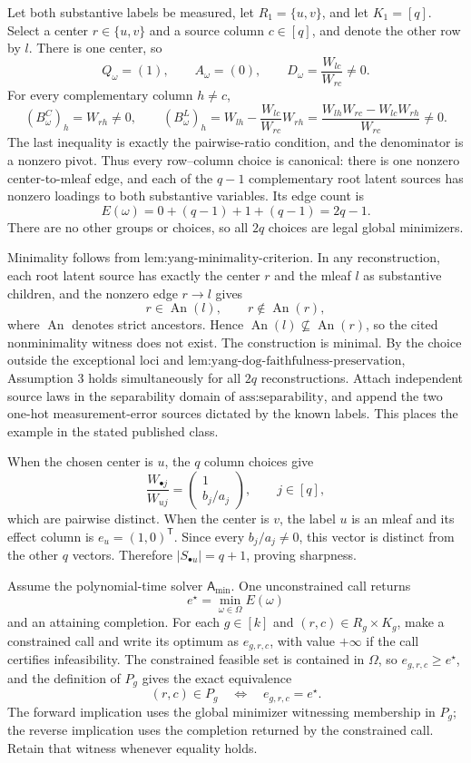 Let both substantive labels be measured, let \(R_1=\{u,v\}\), and let \(K_1=[q]\).  Select a center \(r\in\{u,v\}\) and a source column \(c\in[q]\), and denote the other row by \(l\).  There is one center, so
\[
Q_\omega=(1),
\qquad
A_\omega=(0),
\qquad
D_\omega=\frac{W_{lc}}{W_{rc}}\ne0.
\]
For every complementary column \(h\ne c\),
\[
(B^C_\omega)_h=W_{rh}\ne0,
\qquad
(B^L_\omega)_h
=W_{lh}-\frac{W_{lc}}{W_{rc}}W_{rh}
=\frac{W_{lh}W_{rc}-W_{lc}W_{rh}}{W_{rc}}\ne0.
\]
The last inequality is exactly the pairwise-ratio condition, and the denominator is a nonzero pivot.  Thus every row--column choice is canonical: there is one nonzero center-to-mleaf edge, and each of the \(q-1\) complementary root latent sources has nonzero loadings to both substantive variables.  Its edge count is
\[
E(\omega)=0+(q-1)+1+(q-1)=2q-1.
\]
There are no other groups or choices, so all \(2q\) choices are legal global minimizers.

Minimality follows from \(\text{lem:yang-minimality-criterion}\).  In any reconstruction, each root latent source has exactly the center \(r\) and the mleaf \(l\) as substantive children, and the nonzero edge \(r\to l\) gives
\[
r\in\operatorname{An}(l),
\qquad
r\notin\operatorname{An}(r),
\]
where \(\operatorname{An}\) denotes strict ancestors.  Hence \(\operatorname{An}(l)\nsubseteq\operatorname{An}(r)\), so the cited nonminimality witness does not exist.  The construction is minimal.  By the choice outside the exceptional loci and \(\text{lem:yang-dog-faithfulness-preservation}\), Assumption 3 holds simultaneously for all \(2q\) reconstructions.  Attach independent source laws in the separability domain of \(\text{ass:separability}\), and append the two one-hot measurement-error sources dictated by the known labels.  This places the example in the stated published class.

When the chosen center is \(u\), the \(q\) column choices give
\[
\frac{W_{\bullet j}}{W_{uj}}
=\begin{pmatrix}1\\b_j/a_j\end{pmatrix},
\qquad j\in[q],
\]
which are pairwise distinct.  When the center is \(v\), the label \(u\) is an mleaf and its effect column is \(e_u=(1,0)^\mathsf T\).  Since every \(b_j/a_j\ne0\), this vector is distinct from the other \(q\) vectors.  Therefore \(|S_{\bullet u}|=q+1\), proving sharpness.

Assume the polynomial-time solver \(\mathsf A_{\min}\).  One unconstrained call returns
\[
e^\star=\min_{\omega\in\Omega}E(\omega)
\]
and an attaining completion.  For each \(g\in[k]\) and \((r,c)\in R_g\times K_g\), make a constrained call and write its optimum as \(e_{g,r,c}\), with value \(+\infty\) if the call certifies infeasibility.  The constrained feasible set is contained in \(\Omega\), so \(e_{g,r,c}\ge e^\star\), and the definition of \(P_g\) gives the exact equivalence
\[
(r,c)\in P_g
\quad\Longleftrightarrow\quad
e_{g,r,c}=e^\star.
\]
The forward implication uses the global minimizer witnessing membership in \(P_g\); the reverse implication uses the completion returned by the constrained call.  Retain that witness whenever equality holds.

